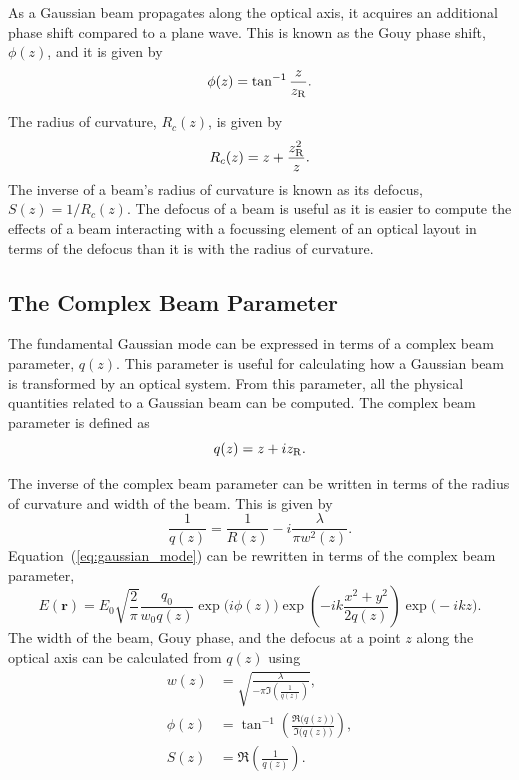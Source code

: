 As a Gaussian beam propagates along the optical axis, it acquires an additional phase shift compared to a plane wave. This is known as the Gouy phase shift, $\phi(z)$, and it is given by
\begin{equation}
	\phi(z) = \tan^{-1}\frac{z}{z_{\rm{R}}}.
\end{equation}
\par
The radius of curvature, $R_c(z)$, is given by
\begin{equation}
R_c(z) = z + \frac{z_{\rm{R}}^2}{z}.
\end{equation}
The inverse of a beam's radius of curvature is known as its defocus, $S(z) = 1/R_c(z)$. The defocus of a beam is useful as it is easier to compute the effects of a beam interacting with a focussing element of an optical layout in terms of the defocus than it is with the radius of curvature.
\subsection{The Complex Beam Parameter}
The fundamental Gaussian mode can be expressed in terms of a complex beam parameter, $q(z)$. This parameter is useful for calculating how a Gaussian beam is transformed by an optical system. From this parameter, all the physical quantities related to a Gaussian beam can be computed. The complex beam parameter is defined as
\begin{equation}
q(z) = z + iz_{\rm{R}}.
\label{eq:eq_q}
\end{equation}
\par
The inverse of the complex beam parameter can be written in terms of the radius of curvature and width of the beam. This is given by
\begin{equation}
\frac{1}{q(z)} = \frac{1}{R(z)} - i\frac{\lambda}{\pi w^2(z)}.
\end{equation} 
Equation~(\ref{eq:gaussian_mode}) can be rewritten in terms of the complex beam parameter,
\begin{equation}
E(\mathbf{r}) = E_0\sqrt{\frac{2}{\pi}} \frac{q_0}{w_0q(z)} \exp\big(i\phi(z)\big)\exp\left( -ik\frac{x^2 + y^2}{2q(z)}\right)\exp\big(-ikz\big).
\end{equation}
The width of the beam, Gouy phase, and the defocus at a point $z$ along the optical axis can be calculated from $q(z)$ using
\begin{align}
w(z) & = \sqrt{\frac{\lambda}{-\pi\Im\left(\frac{1}{q(z)}\right)}},\label{eq:beam_radius}\\
\phi(z) &= \tan^{-1}\left(\frac{\Re\big(q(z)\big)}{\Im\big(q(z)\big)}\right),\label{eq:beam_gouy}\\
S(z) &= \Re\left( \frac{1}{q(z)} \right).\label{eq:beam_defocus}
\end{align}
